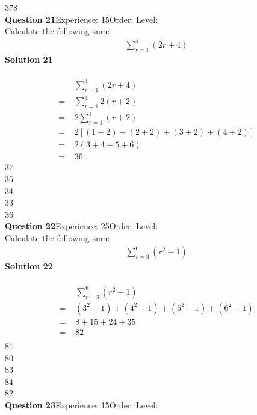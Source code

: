 \documentclass{article}
\begin{document}
378\\
\noindent\textbf{Question 21}\hspace{20pt}Experience: 15\hspace{20pt}Order: \hspace{20pt}Level: \\[2pt]
Calculate the following sum:
\begin{align*}
\sum_{r=1}^{4} (2r+4)
\end{align*}
\noindent\textbf{Solution 21}\\[2pt]
\\[-10pt]\begin{align*}
&\sum_{r=1}^{4} (2r+4)\\[2pt]
=\,\,&\sum_{r=1}^{4} 2(r+2)\\[2pt]
=\,\,&2\sum_{r=1}^{4} (r+2)\\[2pt]
=\,\,&2[(1+2)+(2+2)+(3+2)+(4+2)]\\[2pt]
=\,\,&2(3+4+5+6)\\[2pt]
=\,\,&36
\end{align*}
37\\
35\\
34\\
33\\
36\\
\noindent\textbf{Question 22}\hspace{20pt}Experience: 25\hspace{20pt}Order: \hspace{20pt}Level: \\[2pt]
Calculate the following sum:
\begin{align*}
\sum_{r=3}^{6} (r^2-1)
\end{align*}
\noindent\textbf{Solution 22}\\[2pt]
\\[-10pt]\begin{align*}
&\sum_{r=3}^{6} (r^2-1)\\[2pt]
=\,\,&(3^2-1)+(4^2-1)+(5^2-1)+(6^2-1)\\[2pt]
=\,\,&8+15+24+35\\[2pt]
=\,\,&82\\[-20pt]
\end{align*}
81\\
80\\
83\\
84\\
82\\
\noindent\textbf{Question 23}\hspace{20pt}Experience: 15\hspace{20pt}Order: \hspace{20pt}Level: \\[2pt]
\end{document}
